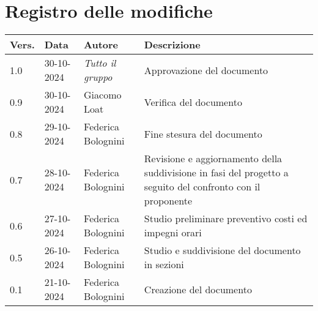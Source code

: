 \section*{Registro delle modifiche}

\begin{table}[h]
    \centering
    \begin{tabular}{|l|l|l|p{5cm}|}
        \hline
        \rowcolor[gray]{0.9}
        \textbf{Vers.} & \textbf{Data} & \textbf{Autore} & \textbf{Descrizione}\\
        \hline
        1.0 & 30-10-2024 & \emph{Tutto il gruppo} & Approvazione del documento\\
        \hline
        0.9 & 30-10-2024 & Giacomo Loat & Verifica del documento\\
        \hline
        0.8 & 29-10-2024 & Federica Bolognini & Fine stesura del documento\\
        \hline
        0.7 & 28-10-2024 & Federica Bolognini & Revisione e aggiornamento della suddivisione in fasi del progetto a seguito del confronto con il proponente\\
        \hline
        0.6 & 27-10-2024 & Federica Bolognini & Studio preliminare preventivo costi ed impegni orari\\
        \hline
        0.5 & 26-10-2024 & Federica Bolognini & Studio e suddivisione del documento in sezioni\\
        \hline
        0.1 & 21-10-2024 & Federica Bolognini & Creazione del documento\\
        \hline
    \end{tabular}
\end{table}
